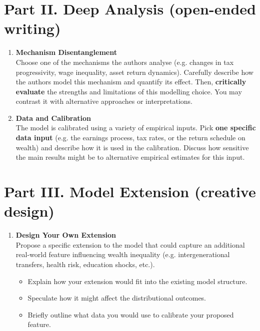 \documentclass[12pt]{article}
\begin{document}
\section*{Part II. Deep Analysis (open-ended writing)}
\begin{enumerate}[start=4, label=\textbf{\arabic*.}]
    \item \textbf{Mechanism Disentanglement} \\
    Choose one of the mechanisms the authors analyse (e.g. changes in tax progressivity, wage inequality, asset return dynamics). Carefully describe how the authors model this mechanism and quantify its effect. Then, \textbf{critically evaluate} the strengths and limitations of this modelling choice. You may contrast it with alternative approaches or interpretations.

    \item \textbf{Data and Calibration} \\
    The model is calibrated using a variety of empirical inputs. Pick \textbf{one specific data input} (e.g. the earnings process, tax rates, or the return schedule on wealth) and describe how it is used in the calibration. Discuss how sensitive the main results might be to alternative empirical estimates for this input.
\end{enumerate}

\section*{Part III. Model Extension (creative design)}
\begin{enumerate}[start=6, label=\textbf{\arabic*.}]
    \item \textbf{Design Your Own Extension} \\
    Propose a specific extension to the model that could capture an additional real-world feature influencing wealth inequality (e.g. intergenerational transfers, health risk, education shocks, etc.).
    \begin{itemize}
        \item Explain how your extension would fit into the existing model structure.
        \item Speculate how it might affect the distributional outcomes.
        \item Briefly outline what data you would use to calibrate your proposed feature.
    \end{itemize}
\end{enumerate}
\end{document}
